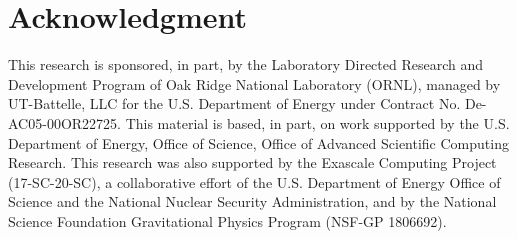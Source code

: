 \section{Acknowledgment} \label{se:Acknowledgment}

This research is sponsored, in part, by the Laboratory Directed Research and Development Program of Oak Ridge National Laboratory (ORNL), managed by UT-Battelle, LLC for the U.S. Department of Energy under Contract No. De-AC05-00OR22725. This material is based, in part, on work supported by the U.S. Department of Energy, Office of Science, Office of Advanced Scientific Computing Research. This research was also supported by the Exascale Computing Project (17-SC-20-SC), a collaborative effort of the U.S. Department of Energy Office of Science and the National Nuclear Security Administration, and by the National Science Foundation Gravitational Physics Program (NSF-GP 1806692).